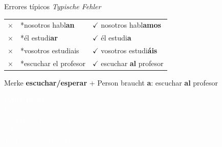 \documentclass[aspectratio=169, 11pt]{beamer}
\newcommand{\de}[1]{\textit{\textcolor{mittelgrau}{#1}}}
\begin{document}
\begin{frame}{Errores típicos \de{Typische Fehler}}
    \vspace{0.5cm}

    \renewcommand{\arraystretch}{1.8}
    \begin{tabular}{cll}
        \textcolor{falsch}{\Large$\times$} & *nosotros habl\textbf{an} & \textcolor{richtig}{\Large$\checkmark$} nosotros habl\textbf{amos} \\
        \textcolor{falsch}{\Large$\times$} & *él estudi\textbf{ar} & \textcolor{richtig}{\Large$\checkmark$} él estudi\textbf{a} \\
        \textcolor{falsch}{\Large$\times$} & *vosotros estudiais & \textcolor{richtig}{\Large$\checkmark$} vosotros estudi\textbf{áis} \\
        \textcolor{falsch}{\Large$\times$} & *escuchar el profesor & \textcolor{richtig}{\Large$\checkmark$} escuchar \textbf{al} profesor \\
    \end{tabular}

    \vspace{0.8cm}

    \begin{block}{Merke}
        \textbf{escuchar/esperar} + Person braucht \textbf{a}: escuchar \textbf{al} profesor
    \end{block}
\end{frame}

\begin{frame}[plain]
    \vspace{3cm}
    \begin{center}
        {\Huge\bfseries\textcolor{white}{¡Muy bien!}}\\[1cm]
        {\Large\textcolor{white}{Heute gelernt:}}\\[0.5cm]
        {\large\textcolor{white}{-ar Verben konjugieren}}\\[0.3cm]
        {\large\textcolor{white}{Schulalltag beschreiben}}\\[0.3cm]
        {\large\textcolor{white}{Text lesen und schreiben}}
    \end{center}
\end{frame}
\end{document}
